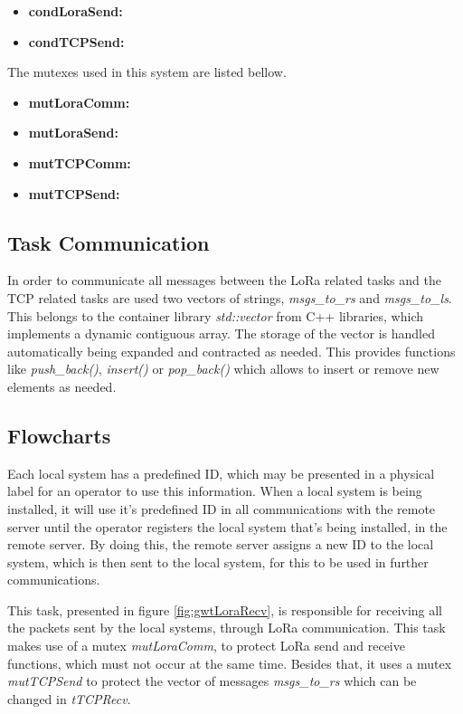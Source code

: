 \begin{itemize}
	\item \textbf{condLoraSend: }
	\item \textbf{condTCPSend: }
\end{itemize}

The mutexes used in this system are listed bellow.

\begin{itemize}
	\item \textbf{mutLoraComm: }
	\item \textbf{mutLoraSend: }
	\item \textbf{mutTCPComm: }
	\item \textbf{mutTCPSend: }
		
\end{itemize}


\subsection{Task Communication}
In order to communicate all messages between the LoRa related tasks and the TCP related tasks are used two vectors of strings, \textit{msgs\_to\_rs} and \textit{msgs\_to\_ls}. This belongs to the container library \textit{std::vector} from C++ libraries, which implements a dynamic contiguous array. The storage of the vector is handled automatically being expanded and contracted as needed. This provides functions like \textit{push\_back()}, \textit{insert()} or \textit{pop\_back()} which allows to insert or remove new elements as needed.

\subsection{Flowcharts}
Each local system has a predefined ID, which may be presented in a physical label for an operator to use this information. When a local system is being installed, it will use it's predefined ID in all communications with the remote server until the operator registers the local system that's being installed, in the remote server. By doing this, the remote server assigns a new ID to the local system, which is then sent to the local system, for this to be used in further communications.

This task, presented in figure \ref{fig:gwtLoraRecv}, is responsible for receiving all the packets sent by the local systems, through LoRa communication. This task makes use of a mutex \textit{mutLoraComm}, to protect LoRa send and receive functions, which must not occur at the same time. Besides that, it uses a mutex \textit{mutTCPSend} to protect the vector of messages \textit{msgs\_to\_rs} which can be changed in \textit{tTCPRecv}.

